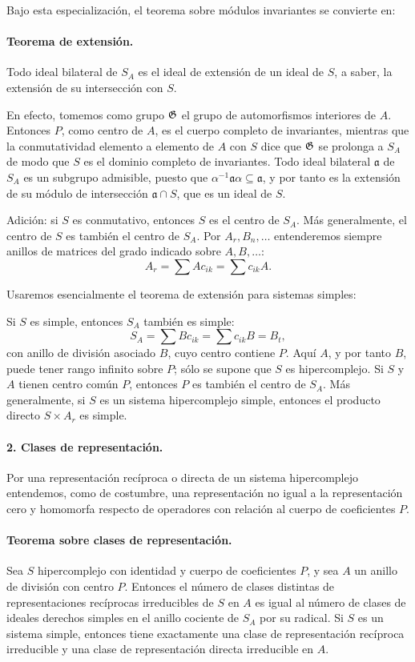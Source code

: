 Bajo esta especialización, el teorema sobre módulos invariantes se convierte en:

\paragraph{Teorema de extensión.}
Todo ideal bilateral de \(S_A\) es el ideal de extensión de un ideal de \(S\), a saber, la extensión de su intersección con \(S\).

En efecto, tomemos como grupo \(\mathfrak G\) el grupo de automorfismos interiores de \(A\). Entonces \(P\), como centro de \(A\), es el cuerpo completo de invariantes, mientras que la conmutatividad elemento a elemento de \(A\) con \(S\) dice que \(\mathfrak G\) se prolonga a \(S_A\) de modo que \(S\) es el dominio completo de invariantes. Todo ideal bilateral \(\mathfrak a\) de \(S_A\) es un subgrupo admisible, puesto que \(\alpha^{-1}\mathfrak a\alpha\subseteq \mathfrak a\), y por tanto es la extensión de su módulo de intersección \(\mathfrak a\cap S\), que es un ideal de \(S\).

Adición: si \(S\) es conmutativo, entonces \(S\) es el centro de \(S_A\). Más generalmente, el centro de \(S\) es también el centro de \(S_A\). Por \(A_r,B_n,\ldots\) entenderemos siempre anillos de matrices del grado indicado sobre \(A,B,\ldots\):
\[
        A_r=\sum A c_{ik}=\sum c_{ik}A.
\]

Usaremos esencialmente el teorema de extensión para sistemas simples:

Si \(S\) es simple, entonces \(S_A\) también es simple:
\[
        S_A=\sum Bc_{ik}=\sum c_{ik}B=B_t,
\]
con anillo de división asociado \(B\), cuyo centro contiene \(P\). Aquí \(A\), y por tanto \(B\), puede tener rango infinito sobre \(P\); sólo se supone que \(S\) es hipercomplejo. Si \(S\) y \(A\) tienen centro común \(P\), entonces \(P\) es también el centro de \(S_A\). Más generalmente, si \(S\) es un sistema hipercomplejo simple, entonces el producto directo \(S\times A_r\) es simple.

\paragraph{2. Clases de representación.}
Por una representación recíproca o directa de un sistema hipercomplejo entendemos, como de costumbre, una representación no igual a la representación cero y homomorfa respecto de operadores con relación al cuerpo de coeficientes \(P\).

\paragraph{Teorema sobre clases de representación.}
Sea \(S\) hipercomplejo con identidad y cuerpo de coeficientes \(P\), y sea \(A\) un anillo de división con centro \(P\). Entonces el número de clases distintas de representaciones recíprocas irreducibles de \(S\) en \(A\) es igual al número de clases de ideales derechos simples en el anillo cociente de \(S_A\) por su radical. Si \(S\) es un sistema simple, entonces tiene exactamente una clase de representación recíproca irreducible y una clase de representación directa irreducible en \(A\).


